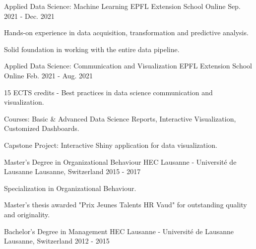 

\begin{cventries}

  \cventry
    {Applied Data Science: Machine Learning} %
    {EPFL Extension School} %
    {Online} %
    {Sep. 2021 - Dec. 2021} %
    {
      \begin{cvitems} %
        \item {Hands-on experience in data acquisition, transformation and predictive analysis.}
        \item {Solid foundation in working with the entire data pipeline.}
      \end{cvitems}
    }

  \cventry
    {Applied Data Science: Communication and Visualization} %
    {EPFL Extension School} %
    {Online} %
    {Feb. 2021 - Aug. 2021} %
    {
      \begin{cvitems} %
        \item {15 ECTS credits - Best practices in data science communication and visualization.}
        \item {Courses: Basic \& Advanced Data Science Reports, Interactive Visualization, Customized Dashboards.}
        \item {Capstone Project: Interactive Shiny application for data visualization.}
      \end{cvitems}
    }

  \cventry
    {Master's Degree in Organizational Behaviour} %
    {HEC Lausanne - Université de Lausanne} %
    {Lausanne, Switzerland} %
    {2015 - 2017} %
    {
      \begin{cvitems} %
        \item {Specialization in Organizational Behaviour.}
        \item {Master's thesis awarded "Prix Jeunes Talents HR Vaud" for outstanding quality and originality.}
      \end{cvitems}
    }

  \cventry
    {Bachelor's Degree in Management} %
    {HEC Lausanne - Université de Lausanne} %
    {Lausanne, Switzerland} %
    {2012 - 2015} %
    {}

\end{cventries}
